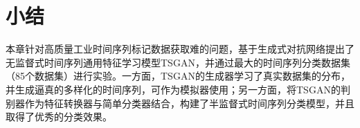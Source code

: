 

\section{小结}

本章针对高质量工业时间序列标记数据获取难的问题，基于生成式对抗网络提出了无监督式时间序列通用特征学习模型TSGAN，并通过最大的时间序列分类数据集（85个数据集）进行实验。一方面，TSGAN的生成器学习了真实数据集的分布，并生成逼真的多样化的时间序列，可作为模拟器使用；另一方面，将TSGAN的判别器作为特征转换器与简单分类器结合，构建了半监督式时间序列分类模型，并且取得了优秀的分类效果。


